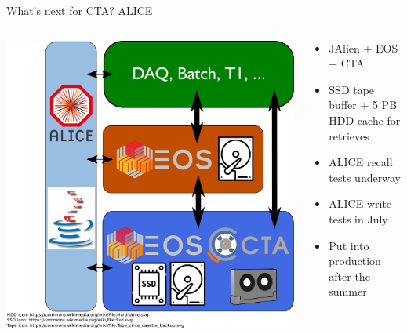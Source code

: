 \documentclass[aspectratio=1610]{beamer}
\begin{document}
\begin{frame}{What's next for CTA? ALICE}
\begin{columns}
	\begin{column}{0.4\textwidth}
		\begin{center}
		  \includegraphics[width=\textwidth]{images/CTA_Deployment_ALICE}
		\end{center}
	\end{column}
	\begin{column}{0.55\textwidth}
		\begin{itemize}
        \item JAlien + EOS + CTA
		  \item SSD tape buffer + 5 PB HDD cache for retrieves
		  \item ALICE recall tests underway
        \item ALICE write tests in July
        \item Put into production after the summer
		\end{itemize}
	\end{column}
\end{columns}
\end{frame}
\end{document}
